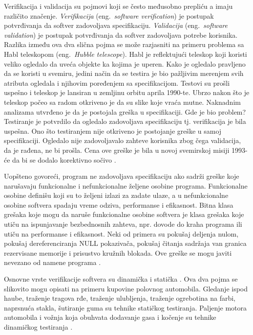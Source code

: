 \documentclass[12pt,oneside]{memoir}
\begin{document}
Verifikacija i validacija su pojmovi koji se često međusobno prepliću a imaju različito značenje. \textit{Verifikacija} (eng.~\textit{software verification}) je postupak potvrđivanja da softver zadovoljava specifikaciju. \textit{Validacija} (eng.~\textit{software validation}) je postupak potvrđivanja da softver zadovoljava potrebe korisnika. %
Razlika između ova dva slična pojma se može razjasniti na primeru problema sa Habl teleskopom (eng.~\textit{Hubble telescope}). Habl je reflektujući teleskop koji koristi veliko ogledalo da uveća objekte ka kojima je uperen. %
Kako je ogledalo pravljeno da se koristi u svemiru, jedini način da se testira je bio pažljivim merenjem svih atributa ogledala i njihovim poređenjem sa specifikacijom. Testovi su prošli uspešno i teleskop je lansiran u zemljinu orbitu aprila 1990-te. Ubrzo nakon što je teleskop počeo sa radom otkriveno je da su slike koje vraća mutne. Naknadnim analizama utvrđeno je da je postojala greška u specifikaciji. %
Gde je bio problem? Testiranje je potvrdilo da ogledalo zadovoljava specifikaciju tj. verifikacija je bila uspešna. Ono što testiranjem nije otkriveno je postojanje greške u samoj specifikaciji. Ogledalo nije zadovoljavalo zahteve korisnika zbog čega validacija, da je rađena, ne bi prošla. Cena ove greške je bila u novoj svemirskoj misiji 1993-će da bi se dodalo korektivno sočivo \cite{SoftTest}.

Uopšteno govoreći, program ne zadovoljava specifikaciju ako sadrži greške koje narušavaju funkcionalne i nefunkcionalne željene osobine programa. Funkcionalne osobine definišu koji su to željeni izlazi za zadate ulaze, a u nefunkcionalne osobine softvera spadaju vreme odziva, performanse i efikasnost. Bitna klasa grešaka koje mogu da naruše funkcionalne osobine softvera je klasa grešaka koje utiču na ispunjavanje bezbednosnih zahteva, npr. dovode do kraha programa ili utiču na performanse i efikasnost. Neki od primera su pokušaj deljenja nulom, pokušaj dereferenciranja NULL pokazivača, pokušaj čitanja sadržaja van granica rezervisane memorije i prisustvo kružnih blokada. Ove greške se mogu javiti nevezano od namene programa  \cite{mvj}.

Osnovne vrste verifikacije softvera su dinamička i statička  \cite{mvj}. Ova dva pojma se slikovito mogu opisati na primeru kupovine polovnog automobila. Gledanje ispod haube, traženje tragova rđe, traženje ulubljenja, traženje ogrebotina na farbi, naprsnuća stakla, šutiranje guma su tehnike statičkog testiranja. Paljenje motora automobila i vožnja koja obuhvata dodavanje gasa i kočenje su tehnike dinamičkog testiranja \cite{SoftTest}.
\end{document}

